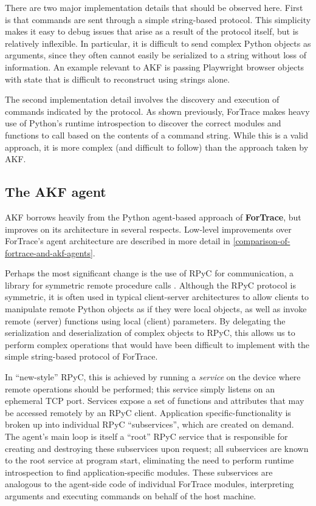 There are two major implementation details that should be observed here.
First is that commands are sent through a simple string-based protocol.
This simplicity makes it easy to debug issues that arise as a result of
the protocol itself, but is relatively inflexible. In particular, it is
difficult to send complex Python objects as arguments, since they often
cannot easily be serialized to a string without loss of information. An
example relevant to AKF is passing Playwright browser objects with state
that is difficult to reconstruct using strings alone.

The second implementation detail involves the discovery and execution of
commands indicated by the protocol. As shown previously, ForTrace makes
heavy use of Python's runtime introspection to discover the correct
modules and functions to call based on the contents of a command string.
While this is a valid approach, it is more complex (and difficult to
follow) than the approach taken by AKF.

\subsection{The AKF agent}\label{the-akf-agent}

AKF borrows heavily from the Python agent-based approach of
\textbf{ForTrace}, but improves on its architecture in several respects.
Low-level improvements over ForTrace's agent architecture are described
in more detail in \autoref{comparison-of-fortrace-and-akf-agents}.

Perhaps the most significant change is the use of RPyC for
communication, a library for symmetric remote procedure calls
\cite{TomerfilibaorgRpyc2025}. Although the RPyC protocol is
symmetric, it is often used in typical client-server architectures to
allow clients to manipulate remote Python objects as if they were local
objects, as well as invoke remote (server) functions using local
(client) parameters. By delegating the serialization and deserialization
of complex objects to RPyC, this allows us to perform complex operations
that would have been difficult to implement with the simple string-based
protocol of ForTrace.

In ``new-style'' RPyC, this is achieved by running a \emph{service} on
the device where remote operations should be performed; this service
simply listens on an ephemeral TCP port. Services expose a set of
functions and attributes that may be accessed remotely by an RPyC
client. Application specific-functionality is broken up into individual
RPyC ``subservices'', which are created on demand. The agent's main loop
is itself a ``root'' RPyC service that is responsible for creating and
destroying these subservices upon request; all subservices are known to
the root service at program start, eliminating the need to perform
runtime introspection to find application-specific modules. These
subservices are analogous to the agent-side code of individual ForTrace
modules, interpreting arguments and executing commands on behalf of the
host machine.

